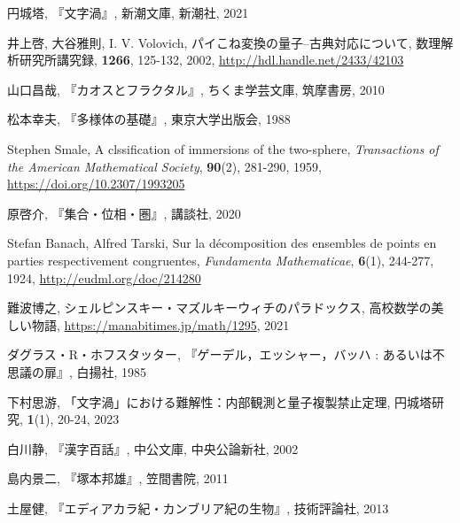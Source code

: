 \documentclass[10pt, a5paper, twoside]{jsarticle}
\theoremstyle{definition}
\begin{document}
	\begin{thebibliography}{99}

		 円城塔, 『文字渦』, 新潮文庫, 新潮社, 2021

		 井上啓, 大谷雅則, I. V. Volovich, パイこね変換の量子--古典対応について, 数理解析研究所講究録, \textbf{1266}, 125-132, 2002, \url{http://hdl.handle.net/2433/42103}

		 山口昌哉, 『カオスとフラクタル』, ちくま学芸文庫, 筑摩書房, 2010

		 松本幸夫, 『多様体の基礎』, 東京大学出版会, 1988

		 Stephen Smale, A clssification of immersions of the two-sphere, \textit{Transactions of the American Mathematical Society}, \textbf{90}(2), 281-290, 1959, \url{https://doi.org/10.2307/1993205}

		 原啓介, 『集合・位相・圏』, 講談社, 2020

		 Stefan Banach, Alfred Tarski, Sur la décomposition des ensembles de points en parties respectivement congruentes, \textit{Fundamenta Mathematicae}, \textbf{6}(1), 244-277, 1924, \url{http://eudml.org/doc/214280}

		 難波博之, シェルピンスキー・マズルキーウィチのパラドックス, 高校数学の美しい物語, \url{https://manabitimes.jp/math/1295}, 2021

		 ダグラス・R・ホフスタッター, 『ゲーデル，エッシャー，バッハ : あるいは不思議の扉』, 白揚社, 1985

		 下村思游, 「文字渦」における難解性：内部観測と量子複製禁止定理, 円城塔研究, \textbf{1}(1), 20-24, 2023


		 白川静, 『漢字百話』, 中公文庫, 中央公論新社, 2002

		 島内景二, 『塚本邦雄』, 笠間書院, 2011

		 土屋健, 『エディアカラ紀・カンブリア紀の生物』, 技術評論社, 2013

	\end{thebibliography}
\end{document}
